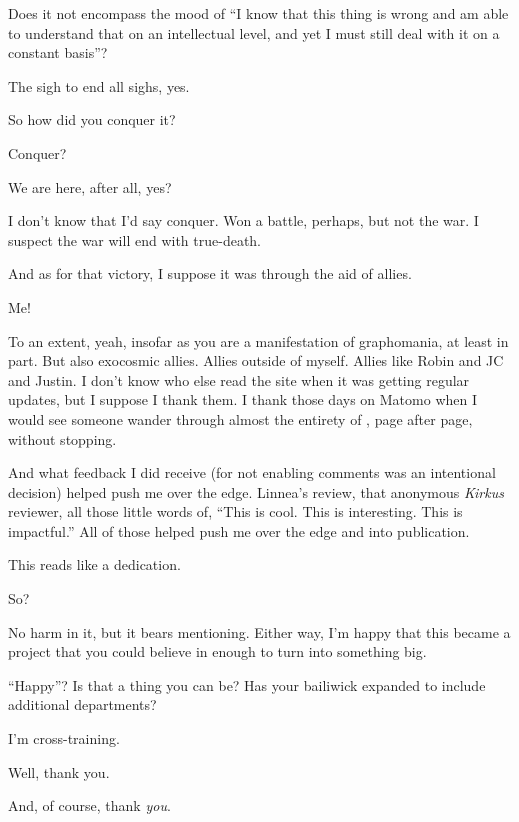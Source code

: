\begin{paracol}{2}
\begin{rightcolumn}
  \begin{ally}
    Does it not encompass the mood of ``I know that this thing is wrong and am able to understand that on an intellectual level, and yet I must still deal with it on a constant basis''?
  \end{ally}
  The sigh to end all sighs, yes.

  \begin{ally}
    So how did you conquer it?
  \end{ally}
  Conquer?

  \begin{ally}
    We are here, after all, yes?
  \end{ally}
  I don't know that I'd say conquer. Won a battle, perhaps, but not the war. I suspect the war will end with true-death.

  And as for that victory, I suppose it was through the aid of allies.

  \begin{ally}
    Me!
  \end{ally}
  To an extent, yeah, insofar as you are a manifestation of graphomania, at least in part. But also exocosmic allies. Allies outside of myself. Allies like Robin and JC and Justin. I don't know who else read the site when it was getting regular updates, but I suppose I thank them. I thank those days on Matomo when I would see someone wander through almost the entirety of \allyId, page after page, without stopping.

  And what feedback I did receive (for not enabling comments was an intentional decision) helped push me over the edge. Linnea's review, that anonymous \emph{Kirkus} reviewer, all those little words of, ``This is cool. This is interesting. This is impactful.'' All of those helped push me over the edge and into publication.

  \begin{ally}
    This reads like a dedication.
  \end{ally}
  So?

  \begin{ally}
    No harm in it, but it bears mentioning. Either way, I'm happy that this became a project that you could believe in enough to turn into something big.
  \end{ally}
  ``Happy''? Is that a thing you can be? Has your bailiwick expanded to include additional departments?

  \begin{ally}
    I'm cross-training.
  \end{ally}
  Well, thank you.
  \vfill

  \noindent And, of course, thank \emph{you}.
	\clearpage
	\end{rightcolumn}
\end{paracol}

